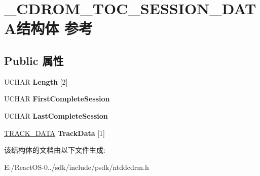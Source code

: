 \hypertarget{struct___c_d_r_o_m___t_o_c___s_e_s_s_i_o_n___d_a_t_a}{}\section{\+\_\+\+C\+D\+R\+O\+M\+\_\+\+T\+O\+C\+\_\+\+S\+E\+S\+S\+I\+O\+N\+\_\+\+D\+A\+T\+A结构体 参考}
\label{struct___c_d_r_o_m___t_o_c___s_e_s_s_i_o_n___d_a_t_a}
\subsection*{Public 属性}
\begin{DoxyCompactItemize}
\item 
\mbox{\label{struct___c_d_r_o_m___t_o_c___s_e_s_s_i_o_n___d_a_t_a_af1f088ca54db46678b43350272a2d896}} 
U\+C\+H\+AR {\bfseries Length} \mbox{[}2\mbox{]}
\item 
\mbox{\label{struct___c_d_r_o_m___t_o_c___s_e_s_s_i_o_n___d_a_t_a_a0da8666f973323a048e39257346d91ca}} 
U\+C\+H\+AR {\bfseries First\+Complete\+Session}
\item 
\mbox{\label{struct___c_d_r_o_m___t_o_c___s_e_s_s_i_o_n___d_a_t_a_a4e6dc3ac6433ffbc5566affa4ecb844e}} 
U\+C\+H\+AR {\bfseries Last\+Complete\+Session}
\item 
\mbox{\label{struct___c_d_r_o_m___t_o_c___s_e_s_s_i_o_n___d_a_t_a_a8ccefa2b285a3647b0c9cee1c0ce8a35}} 
\hyperlink{struct___t_r_a_c_k___d_a_t_a}{T\+R\+A\+C\+K\+\_\+\+D\+A\+TA} {\bfseries Track\+Data} \mbox{[}1\mbox{]}
\end{DoxyCompactItemize}


该结构体的文档由以下文件生成\+:\begin{DoxyCompactItemize}
\item 
E\+:/\+React\+O\+S-\/0../sdk/include/psdk/ntddcdrm.\+h\end{DoxyCompactItemize}
